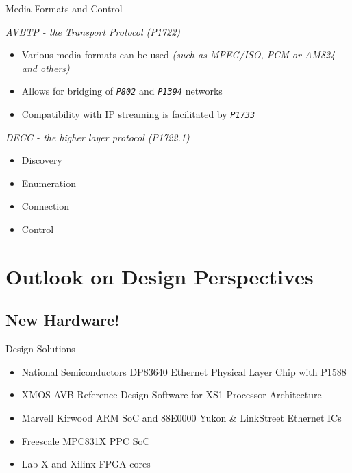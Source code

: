 \documentclass{beamer}
\begin{document}
\begin{frame}{ Media Formats and Control }

\emph{  AVBTP - the Transport Protocol (P1722) }

\begin{itemize}

	\item Various media formats can be used
	\newline \emph{ (such as MPEG/ISO, PCM or AM824 and others) }

	\item Allows for bridging of \emph{\texttt{P802}} and \emph{\texttt{P1394}} networks

	\item Compatibility with IP streaming is facilitated by \emph{\texttt{P1733}} 

\end{itemize}

\emph{ DECC - the higher layer protocol (P1722.1)  }
\begin{itemize}
	\item Discovery
	\item Enumeration
	\item Connection
	\item Control 
\end{itemize}

\end{frame}


\section{Outlook on Design Perspectives}

\subsection{New Hardware!}

\begin{frame}{ Design Solutions }

\begin{itemize}
	\item National Semiconductors DP83640
	\newline Ethernet Physical Layer Chip with P1588 
	\item XMOS AVB Reference Design Software
	\newline for XS1 Processor Architecture
	\item Marvell Kirwood ARM SoC
	\newline and 88E0000 Yukon \& LinkStreet Ethernet ICs
	\item Freescale MPC831X PPC SoC
	\item Lab-X and Xilinx FPGA cores
\end{itemize}

\end{frame}
\end{document}
